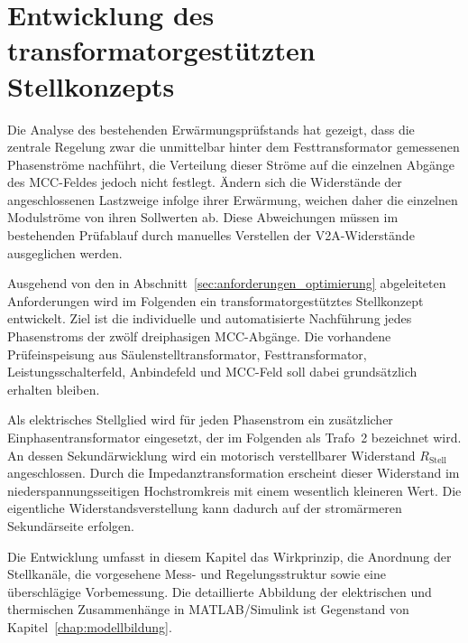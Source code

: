 \section{Entwicklung des transformatorgestützten Stellkonzepts}
\label{chap:entwicklung_stellkonzept}

Die Analyse des bestehenden Erwärmungsprüfstands hat gezeigt, dass die
zentrale Regelung zwar die unmittelbar hinter dem Festtransformator
gemessenen Phasenströme nachführt, die Verteilung dieser Ströme auf die
einzelnen Abgänge des MCC-Feldes jedoch nicht festlegt. Ändern sich die
Widerstände der angeschlossenen Lastzweige infolge ihrer Erwärmung,
weichen daher die einzelnen Modulströme von ihren Sollwerten ab. Diese
Abweichungen müssen im bestehenden Prüfablauf durch manuelles
Verstellen der V2A-Widerstände ausgeglichen werden.

Ausgehend von den in
Abschnitt~\ref{sec:anforderungen_optimierung}
abgeleiteten Anforderungen wird im Folgenden ein
transformatorgestütztes Stellkonzept entwickelt. Ziel ist die
individuelle und automatisierte Nachführung jedes Phasenstroms der
zwölf dreiphasigen MCC-Abgänge. Die vorhandene Prüfeinspeisung aus
Säulenstelltransformator, Festtransformator, Leistungsschalterfeld,
Anbindefeld und MCC-Feld soll dabei grundsätzlich erhalten bleiben.

Als elektrisches Stellglied wird für jeden Phasenstrom ein zusätzlicher
Einphasentransformator eingesetzt, der im Folgenden als Trafo~2
bezeichnet wird. An dessen Sekundärwicklung wird ein motorisch
verstellbarer Widerstand \(R_{\mathrm{Stell}}\) angeschlossen. Durch
die Impedanztransformation erscheint dieser Widerstand im
niederspannungsseitigen Hochstromkreis mit einem wesentlich kleineren
Wert. Die eigentliche Widerstandsverstellung kann dadurch auf der
stromärmeren Sekundärseite erfolgen.

Die Entwicklung umfasst in diesem Kapitel das Wirkprinzip, die
Anordnung der Stellkanäle, die vorgesehene Mess- und Regelungsstruktur
sowie eine überschlägige Vorbemessung. Die detaillierte Abbildung der
elektrischen und thermischen Zusammenhänge in MATLAB/Simulink ist
Gegenstand von Kapitel~\ref{chap:modellbildung}.


